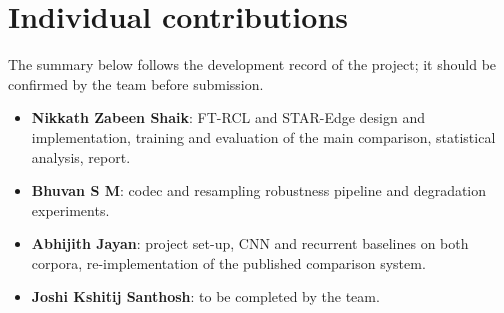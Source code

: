 \section*{Individual contributions}

The summary below follows the development record of the project; it should be confirmed by the team before submission.

\begin{itemize}
  \item \textbf{Nikkath Zabeen Shaik}: FT-RCL and STAR-Edge design and implementation, training and evaluation of the main comparison, statistical analysis, report.
  \item \textbf{Bhuvan S M}: codec and resampling robustness pipeline and degradation experiments.
  \item \textbf{Abhijith Jayan}: project set-up, CNN and recurrent baselines on both corpora, re-implementation of the published comparison system.
  \item \textbf{Joshi Kshitij Santhosh}: to be completed by the team.
\end{itemize}
